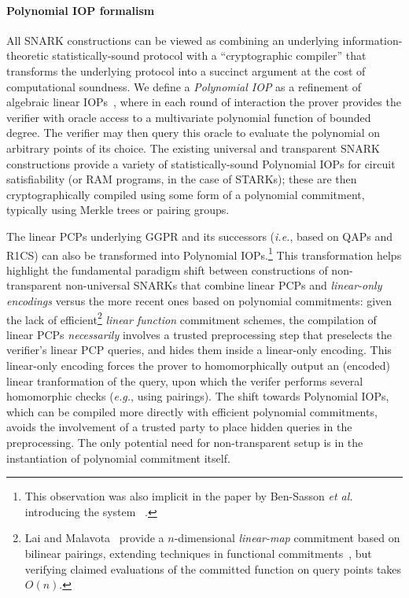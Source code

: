 \paragraph{Polynomial IOP formalism} %
All SNARK constructions can be viewed as combining an underlying information-theoretic statistically-sound protocol with a ``cryptographic compiler'' that transforms the underlying protocol into a succinct argument at the cost of computational soundness. 
We define a \emph{Polynomial IOP} as a refinement of algebraic linear IOPs~\cite{CC:IKO07,TCC:BCIOP13,C:BBCGI19}, where in each round of interaction the prover provides the verifier with oracle access to a multivariate polynomial function of bounded degree. The verifier may then query this oracle to evaluate the polynomial on arbitrary points of its choice. The existing universal and transparent SNARK constructions provide a variety of statistically-sound Polynomial IOPs for circuit satisfiability (or RAM programs, in the case of \textsf{STARK}s); these are then cryptographically compiled using some form of a polynomial commitment, typically using Merkle trees or pairing groups.

The linear PCPs underlying GGPR and its successors (\emph{i.e.}, based on QAPs and R1CS) can also be transformed into Polynomial IOPs.\footnote{This observation was also implicit in the paper by Ben-Sasson \emph{et al.} introducing the system ~\cite{EC:BCRSVW19}.} This transformation helps highlight the fundamental paradigm shift between constructions of non-transparent non-universal SNARKs that combine linear PCPs and \emph{linear-only encodings} versus the more recent ones based on polynomial commitments: given the lack of efficient\footnote{Lai and Malavota~\cite{C:LaiMal19} provide a $n$-dimensional \emph{linear-map} commitment based on bilinear pairings, extending techniques in functional commitments~\cite{ICALP:LibRamYun16}, but verifying claimed evaluations of the committed function on query points takes $O(n)$.} \emph{linear function} commitment schemes, the compilation of linear PCPs \emph{necessarily} involves a trusted preprocessing step that preselects the verifier's linear PCP queries, and hides them inside a linear-only encoding. This linear-only encoding forces the prover to homomorphically output an (encoded) linear tranformation of the query, upon which the verifer performs several homomorphic checks (\emph{e.g.}, using pairings).
The shift towards Polynomial IOPs, which can be compiled more directly with efficient polynomial commitments, avoids the involvement of a trusted party to place hidden queries in the preprocessing. The only potential need for non-transparent setup is in the instantiation of polynomial commitment itself.

